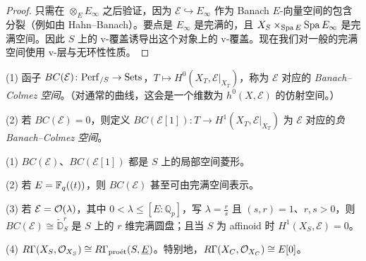 \begin{proof}
只需在 $\widehat{\otimes}_E E_\infty$ 之后验证，因为 $\mathcal{E}\hookrightarrow E_\infty$ 作为 Banach $E$-向量空间的包含分裂（例如由 Hahn--Banach）。要点是 $E_\infty$ 是完满的，且 $X_S\times_{\operatorname{Spa} E}\operatorname{Spa} E_\infty$ 是完满空间。因此 $S$ 上的 v-覆盖诱导出这个对象上的 v-覆盖。现在我们对一般的完满空间使用 v-层与无环性性质。
\end{proof}

\begin{definition}
(1) 函子 $BC(\mathcal{E})\colon\mathrm{Perf}_{/S}\to\mathrm{Sets}$，$T\mapsto H^0(X_T,\mathcal{E}|_{X_T})$，称为 $\mathcal{E}$ 对应的 \emph{Banach--Colmez 空间}。（对通常的曲线，这会是一个维数为 $h^0(X,\mathcal{E})$ 的仿射空间。）

(2) 若 $BC(\mathcal{E})=0$，则定义 $BC(\mathcal{E}[1])\colon T\to H^1(X_T,\mathcal{E}|_{X_T})$ 为 $\mathcal{E}$ 对应的\emph{负 Banach--Colmez 空间}。
\end{definition}

\begin{proposition}
(1) $BC(\mathcal{E})$、$BC(\mathcal{E}[1])$ 都是 $S$ 上的局部空间菱形。

(2) 若 $E=\mathbb{F}_q((t))$，则 $BC(\mathcal{E})$ 甚至可由完满空间表示。

(3) 若 $\mathcal{E}=\mathcal{O}(\lambda)$，其中 $0<\lambda\le[E:\mathbb{Q}_p]$，写 $\lambda=\frac{r}{s}$ 且 $(s,r)=1$、$r,s>0$，则 $BC(\mathcal{E})\cong\widetilde{\mathbb{D}}^r_S$ 是 $S$ 上的 $r$ 维完满圆盘；且当 $S$ 为 affinoid 时 $H^1(X_S,\mathcal{E})=0$。

(4) $R\Gamma(X_S,\mathcal{O}_{X_S})\cong R\Gamma_{\text{proét}}(S,\underline{E})$。特别地，$R\Gamma(X_C,\mathcal{O}_{X_C})\cong E[0]$。
\end{proposition}

